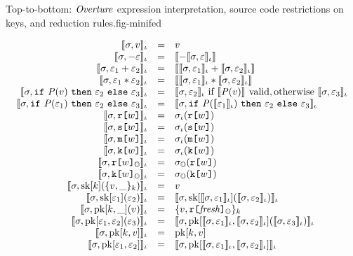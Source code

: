 \begin{fpfig}[t]{Top-to-bottom: $\minifed$ expression interpretation, source code restrictions on keys, and reduction rules.}{fig-minifed}
{  $$
  \begin{array}{rcl}
    \lcod{\store, v}{\cid} &=& v\\
    \lcod{\store, \fminus \be}{\cid} & = &  \fcod{\fminus \lcod{\store, \be}{\cid}}\\ 
    \lcod{\store, \be_1 \fplus \be_2}{\cid} &=& \fcod{\lcod{\store, \be_1}{\cid} \fplus \lcod{\store, \be_2}{\cid}}\\ 
    \lcod{\store, \be_1 \ftimes \be_2}{\cid} &=& \fcod{\lcod{\store, \be_1}{\cid} \ftimes \lcod{\store, \be_2}{\cid}}\\
    \lcod{\store, \select{\fp(v)}{\be_2}{\be_3}}{\cid} &=&
      \lcod{\store, \be_2}{\cid}\ \text{if}\ \fcod{\fp(v)}\ \text{valid}, 
      \text{otherwise}\ \lcod{\store, \be_3}{\cid}\\
    \lcod{\store, \select{\fp(\be_1)}{\be_2}{\be_3}}{\cid} &=& \lcod{\store, \select{\fp(\lcod{\be_1}{\cid})}{\be_2}{\be_3}}{\cid}\\
    \lcod{\store, \flip{w}}{\cid} &=& \store_\cid(\flip{w})\\
    \lcod{\store, \secret{w}}{\cid} &=& \store_\cid(\secret{w})\\
    \lcod{\store, \mesg{w}}{\cid} &=& \store_\cid(\mesg{w})\\
    \lcod{\store, \key{w}}{\cid}  &=&  \store_\cid(\key{w})\\
    \lcod{\store, \elab{\flip{w}}{\Oracle}}{\cid} &=& \store_\Oracle(\flip{w})\\
    \lcod{\store, \elab{\key{w}}{\Oracle}}{\cid} &=& \store_\Oracle(\key{w})\\
    \lcod{\store, \sk{k}(\ctxt{v,\_}{k})}{\cid} &=& v\\
    \lcod{\store, \sk{\be_1}(\be_2)}{\cid} &=& \lcod{\store, \sk{\lcod{\store,\be_1}{\cid}}(\lcod{\store, \be_2}{\cid})}{\cid}\\
    \lcod{\store, \pk{k}{\_}(v)}{\cid} &=& \ctxt{v,\elab{\flip{\mathit{fresh}}}{\Oracle}}{k}\\
    \lcod{\store, \pk{\be_1}{\be_2}(\be_3)}{\cid} &=&  
       \lcod{\store, \pk{\lcod{\store,\be_1}{\cid}}{\lcod{\store, \be_2}{\cid}}(\lcod{\store, \be_3}{\cid})}{\cid}\\
    \lcod{\store, \pk{k}{v}}{\cid} &=& \pk{k}{v}\\
    \lcod{\store, \pk{\be_1}{\be_2}}{\cid} &=& \lcod{\store, \pk{\lcod{\store,\be_1}{\cid}}{\lcod{\store, \be_2}{\cid}}}{\cid}
  \end{array} 
  $$

}
\end{fpfig}
